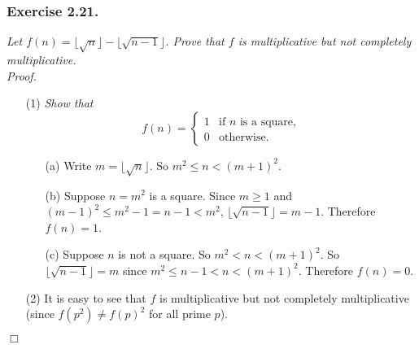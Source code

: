 \documentclass{article}
\begin{document}



\subsubsection*{Exercise 2.21.}
\emph{Let $f(n) = \lfloor \sqrt{n} \rfloor - \lfloor \sqrt{n-1} \rfloor$.
Prove that $f$ is multiplicative but not completely multiplicative.} \\



\emph{Proof.}
\begin{enumerate}
\item[(1)]
  \emph{Show that}
  \begin{equation*}
    f(n) =
    \begin{cases}
      1 & \text{if $n$ is a square,} \\
      0 & \text{otherwise}.
    \end{cases}
  \end{equation*}
  \begin{enumerate}
  \item[(a)]
    Write $m = \lfloor \sqrt{n} \rfloor$. So $m^2 \leq n < (m+1)^2$.

  \item[(b)]
    Suppose $n = m^2$ is a square.
    Since $m \geq 1$ and $(m-1)^2 \leq m^2 - 1 = n - 1 < m^2$,
    $\lfloor \sqrt{n-1} \rfloor = m - 1$.
    Therefore $f(n) = 1$.

  \item[(c)]
    Suppose $n$ is not a square.
    So $m^2 < n < (m+1)^2$.
    So $\lfloor \sqrt{n-1} \rfloor = m$ since $m^2 \leq n - 1 < n < (m+1)^2$.
    Therefore $f(n) = 0$.
  \end{enumerate}

\item[(2)]
  It is easy to see that $f$ is multiplicative but not completely multiplicative
  (since $f(p^2) \neq f(p)^2$ for all prime $p$).
\end{enumerate}
$\Box$ \\\\



\end{document}
